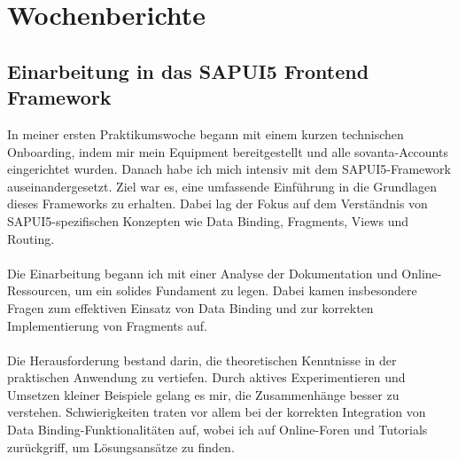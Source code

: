 \chapter{Wochenberichte}
\label{ch:wochenberichte}

\section{Einarbeitung in das SAPUI5 Frontend Framework}
In meiner ersten Praktikumswoche begann mit einem kurzen technischen Onboarding, indem mir mein Equipment bereitgestellt und alle sovanta-Accounts eingerichtet wurden. Danach habe ich mich intensiv mit dem SAPUI5-Framework auseinandergesetzt. Ziel war es, eine umfassende Einführung in die Grundlagen dieses Frameworks zu erhalten. Dabei lag der Fokus auf dem Verständnis von SAPUI5-spezifischen Konzepten wie Data Binding, Fragments, Views und Routing. \\\\
Die Einarbeitung begann ich mit einer Analyse der Dokumentation und Online-Ressourcen, um ein solides Fundament zu legen. Dabei kamen insbesondere Fragen zum effektiven Einsatz von Data Binding und zur korrekten Implementierung von Fragments auf. \\\\
Die Herausforderung bestand darin, die theoretischen Kenntnisse in der praktischen Anwendung zu vertiefen. Durch aktives Experimentieren und Umsetzen kleiner Beispiele gelang es mir, die Zusammenhänge besser zu verstehen. Schwierigkeiten traten vor allem bei der korrekten Integration von Data Binding-Funktionalitäten auf, wobei ich auf Online-Foren und Tutorials zurückgriff, um Lösungsansätze zu finden. \\\\

